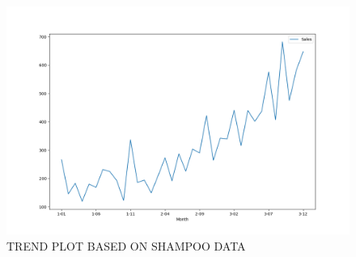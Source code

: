 \documentclass[12pt, letterpaper, twoside]{article}
\begin{document}
\begin{figure}[bp!]                                                                                                                                                                 \centering
	        \includegraphics[width=1\textwidth]{Shampoo_data_Trend_plot.png}
			                    \caption{TREND PLOT BASED ON SHAMPOO DATA}
					                            \label{fig:2.1}
\end{figure}
\end{document}
